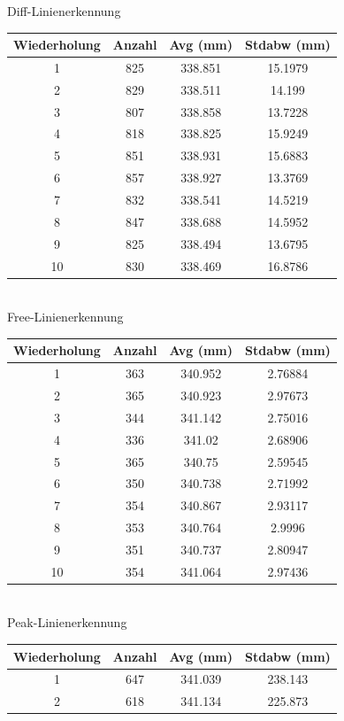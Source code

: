 \documentclass[ngerman,a4paper,parskip=half]{scrartcl}
\begin{document}
\begin{table}[H]
	\centering
	Diff-Linienerkennung \\
	\begin{tabular}{c|c|c|c}
		Wiederholung & Anzahl & Avg (mm) & Stdabw (mm) \\ \hline
		1 & 825 & 338.851 & 15.1979 \\
		2 & 829 & 338.511 & 14.199 \\
		3 & 807 & 338.858 & 13.7228 \\
		4 & 818 & 338.825 & 15.9249 \\
		5 & 851 & 338.931 & 15.6883 \\
		6 & 857 & 338.927 & 13.3769 \\
		7 & 832 & 338.541 & 14.5219 \\
		8 & 847 & 338.688 & 14.5952 \\
		9 & 825 & 338.494 & 13.6795 \\
		10 & 830 & 338.469 & 16.8786 \\
	\end{tabular} \\
	\vspace{1em}
	Free-Linienerkennung \\
	\begin{tabular}{c|c|c|c}
		Wiederholung & Anzahl & Avg (mm) & Stdabw (mm) \\ \hline
		1 & 363 & 340.952 & 2.76884 \\
		2 & 365 & 340.923 & 2.97673 \\
		3 & 344 & 341.142 & 2.75016 \\
		4 & 336 & 341.02 & 2.68906 \\
		5 & 365 & 340.75 & 2.59545 \\
		6 & 350 & 340.738 & 2.71992 \\
		7 & 354 & 340.867 & 2.93117 \\
		8 & 353 & 340.764 & 2.9996 \\
		9 & 351 & 340.737 & 2.80947 \\
		10 & 354 & 341.064 & 2.97436 \\
	\end{tabular} \\
	\vspace{1em}
	Peak-Linienerkennung \\
		\begin{tabular}{c|c|c|c}
		Wiederholung & Anzahl & Avg (mm) & Stdabw (mm) \\ \hline
		1 & 647 & 341.039 & 238.143 \\
		2 & 618 & 341.134 & 225.873 \\

\end{tabular}
\end{table}
\end{document}
